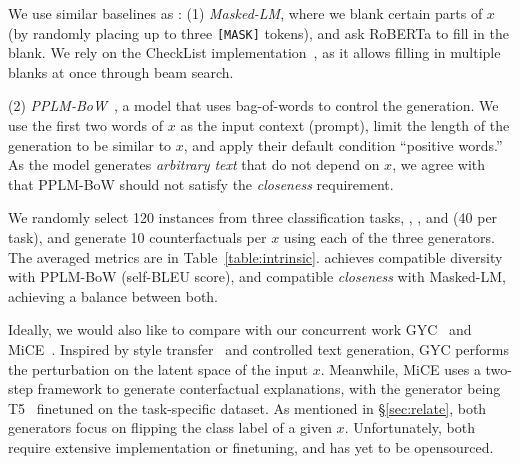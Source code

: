 We use similar baselines as \citet{madaan2020generate}: 
(1) \emph{Masked-LM}, where we blank certain parts of $x$ (by randomly placing up to three \texttt{[MASK]} tokens), and ask RoBERTa to fill in the blank.
We rely on the CheckList implementation~\cite{checklist:acl20}, as it allows filling in multiple blanks at once through beam search. 

(2) \emph{PPLM-BoW}~\cite{Dathathri2020Plug}, a model that uses bag-of-words to control the generation.
We use the first two words of $x$ as the input context (prompt), limit the length of the generation to be similar to $x$, and apply their default condition ``positive words.''
As the model generates \emph{arbitrary text} that do not depend on $x$, we agree with \citet{madaan2020generate} that PPLM-BoW should not satisfy the \emph{closeness} requirement.

We randomly select 120 instances from three classification tasks, \qqp, \nli, and \sst (40 per task), and generate 10 counterfactuals per $x$ using each of the three generators.
The averaged metrics are in Table~\ref{table:intrinsic}.
\sysname achieves compatible diversity with PPLM-BoW (self-BLEU score), and compatible \emph{closeness} with Masked-LM, achieving a balance between both.


Ideally, we would also like to compare \sysname with our concurrent work GYC~\cite{madaan2020generate} and MiCE~\cite{ross2020explaining}.
Inspired by style transfer~\cite{yang2018unsupervised} and controlled text generation, GYC performs the perturbation on the latent space of the input $x$.
Meanwhile, MiCE uses a two-step framework to generate conterfactual explanations, with the generator being T5~\cite{JMLR:v21:20-074} finetuned on the task-specific dataset.
As mentioned in \S\ref{sec:relate}, both generators focus on flipping the class label of a given $x$.
Unfortunately, both require extensive implementation or finetuning, and has yet to be opensourced.





